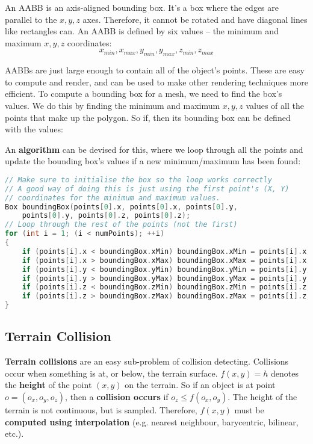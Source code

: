 \documentclass{article}
\begin{document}
An AABB is an axis-aligned bounding box. It's a box where the edges are parallel to the $x,y,z$ axes. Therefore, it cannot be rotated and have diagonal lines like rectangles can. An AABB is defined by six values – the minimum and maximum $x,y,z$ coordinates:
\begin{equation}
	x_{min}, x_{max}, y_{min}, y_{max}, z_{min}, z_{max}
\end{equation}

AABBs are just large enough to contain all of the object's points. These are easy to compute and render, and can be used to make other rendering techniques more efficient. To compute a bounding box for a mesh, we need to find the box's values. We do this by finding the minimum and maximum $x,y,z$ values of all the points that make up the polygon. So if, then its bounding box can be defined with the values:

An \textbf{algorithm} can be devised for this, where we loop through all the points and update the bounding box's values if a new minimum/maximum has been found:
\begin{lstlisting}[language=c]
// Make sure to initialise the box so the loop works correctly
// A good way of doing this is just using the first point's (X, Y)
// coordinates for the minimum and maximum values.
Box boundingBox(points[0].x, points[0].x, points[0].y,
	points[0].y, points[0].z, points[0].z);
// Loop through the rest of the points (not the first)
for (int i = 1; (i < numPoints); ++i)
{
    if (points[i].x < boundingBox.xMin) boundingBox.xMin = points[i].x;
    if (points[i].x > boundingBox.xMax) boundingBox.xMax = points[i].x;
    if (points[i].y < boundingBox.yMin) boundingBox.yMin = points[i].y;
    if (points[i].y > boundingBox.yMax) boundingBox.yMax = points[i].y;
    if (points[i].z < boundingBox.zMin) boundingBox.zMin = points[i].z;
    if (points[i].z > boundingBox.zMax) boundingBox.zMax = points[i].z;
}
\end{lstlisting}

\subsection{Terrain Collision}

\textbf{Terrain collisions} are an easy sub-problem of collision detecting. Collisions occur when something is at, or below, the terrain surface. $f(x, y) = h$ denotes the \textbf{height} of the point $(x, y)$ on the terrain. So if an object is at point $o = (o_x, o_y, o_z)$, then a \textbf{collision occurs} if $o_z \leq f(o_x, o_y)$. The height of the terrain is not continuous, but is sampled. Therefore, $f(x, y)$ must be \textbf{computed using interpolation} (e.g. nearest neighbour, barycentric, bilinear, etc.).
\end{document}
